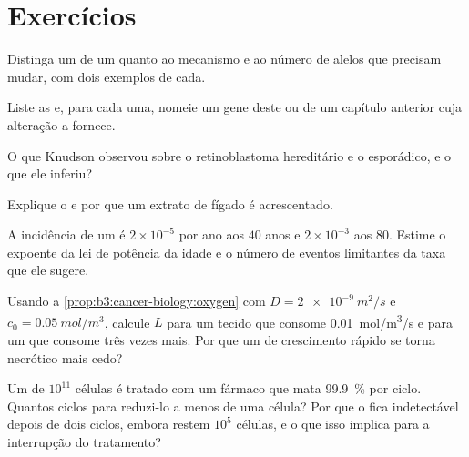 \section{Exercícios}

\begin{exercise}[$\star$]\label{exo:b3:cancer-biology:1}
Distinga um  de um  quanto ao mecanismo
e ao número de alelos que precisam mudar, com dois exemplos de cada.
\end{exercise}

\begin{exercise}[$\star$]\label{exo:b3:cancer-biology:2}
Liste as  e, para cada uma, nomeie um gene deste ou de
um capítulo anterior cuja alteração a fornece.
\end{exercise}

\begin{exercise}[$\star$]\label{exo:b3:cancer-biology:3}
O que Knudson observou sobre o retinoblastoma hereditário e o
esporádico, e o que ele inferiu?
\end{exercise}

\begin{exercise}[$\star$]\label{exo:b3:cancer-biology:4}
Explique o  e por que um extrato de fígado é acrescentado.
\end{exercise}

\begin{exercise}[$\star\star$]\label{exo:b3:cancer-biology:5}
A incidência de um  é $2\times 10^{-5}$ por ano aos $40$ anos e
$2\times 10^{-3}$ aos $80$. Estime o expoente da lei de potência da
idade e o número de eventos limitantes da taxa que ele sugere.
\end{exercise}

\begin{exercise}[$\star\star$]\label{exo:b3:cancer-biology:6}
Usando a \cref{prop:b3:cancer-biology:oxygen} com
$D =
\qty{2e-9}{m^2/s}$ e $c_{0} = \qty{0.05}{mol/m^3}$, calcule $L$
para um tecido que consome \qty{0.01}{mol/m^3/s} e para um  que
consome três vezes mais. Por que um  de crescimento rápido se
torna necrótico mais cedo?
\end{exercise}

\begin{exercise}[$\star\star$]\label{exo:b3:cancer-biology:7}
Um  de $10^{11}$ células é tratado com um fármaco que mata
\qty{99.9}{\%} por ciclo. Quantos ciclos para reduzi-lo a menos de uma
célula? Por que o  fica indetectável depois de dois ciclos, embora
restem $10^{5}$ células, e o que isso implica para a interrupção do
tratamento?
\end{exercise}


